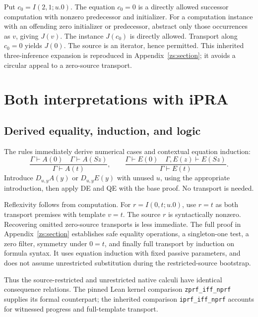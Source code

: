 \documentclass[11pt]{article}
\theoremstyle{definition}\newtheorem{definition}[theorem]{Definition}
\theoremstyle{remark}\newtheorem{remark}[theorem]{Remark}
\begin{document}
Put $c_0=I(2,1;u.0)$. The equation $c_0=0$ is a directly allowed
successor computation with nonzero predecessor and initializer.
For a computation instance with an offending zero initializer or
predecessor, abstract only those occurrences as $v$, giving $J(v)$.
The instance $J(c_0)$ is directly allowed. Transport along $c_0=0$
yields $J(0)$. The source is an iterator, hence permitted.
This inherited three-inference expansion is reproduced in
Appendix~\ref{zs:section}; it avoids a circular appeal to a
zero-source transport.

\section{Both interpretations with iPRA}\label{main:interpretations}

\subsection{Derived equality, induction, and logic}

The rules immediately derive numerical cases and contextual equation
induction:
\[
\frac{\Gamma\vdash A(0)\quad\Gamma\vdash A(Sz)}
     {\Gamma\vdash A(t)},\qquad
\frac{\Gamma\vdash E(0)\quad\Gamma,E(z)\vdash E(Sz)}
     {\Gamma\vdash E(t)}.
\tag{Cases and EI}
\]
Introduce $D_{u,y}A(y)$ or $D_{u,y}E(y)$ with unused $u$, using the
appropriate introduction, then apply DE and QE with the base proof.
No transport is needed.

Reflexivity follows from computation. For $r=I(0,t;u.0)$, use $r=t$
as both transport premises with template $v=t$. The source $r$ is
syntactically nonzero. Recovering omitted zero-source transports is
less immediate. The full proof in Appendix~\ref{zs:section} establishes
safe equality operations, a singleton-one test, a zero filter, symmetry
under $0=t$, and finally full transport by induction on formula syntax.
It uses equation induction with fixed passive parameters, and does not
assume unrestricted substitution during the restricted-source bootstrap.

Thus the source-restricted and unrestricted native calculi have
identical consequence relations. The pinned Lean kernel comparison
\texttt{zprf\_iff\_nprf} supplies its formal counterpart; the inherited
comparison \texttt{iprf\_iff\_nprf} accounts for witnessed progress
and full-template transport.
\end{document}
